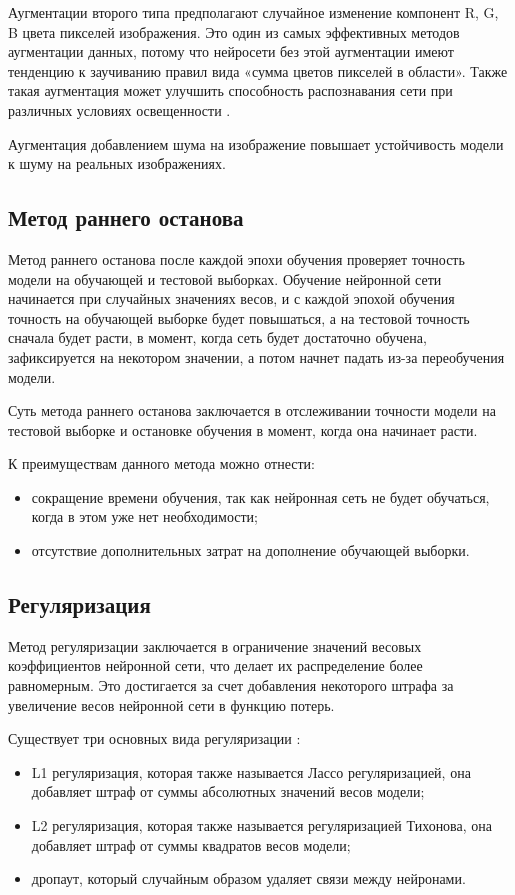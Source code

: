 Аугментации второго типа предполагают случайное изменение компонент R, G, B цвета пикселей изображения. Это один из самых эффективных методов аугментации данных, потому что нейросети без этой аугментации имеют тенденцию к заучиванию правил вида «сумма цветов пикселей в области». Также такая аугментация может улучшить способность распознавания сети при различных условиях освещенности \cite{augmentation}.

Аугментация добавлением шума на изображение повышает устойчивость модели к шуму на реальных изображениях.

\subsection{Метод раннего останова}
Метод раннего останова после каждой эпохи обучения проверяет точность модели на обучающей и тестовой выборках. Обучение нейронной сети начинается при случайных значениях весов, и с каждой эпохой обучения точность на обучающей выборке будет повышаться, а на тестовой точность сначала будет расти, в момент, когда сеть будет достаточно обучена, зафиксируется на некотором значении, а потом начнет падать из-за переобучения модели.

Суть метода раннего останова заключается в отслеживании точности модели на тестовой выборке и остановке обучения в момент, когда она начинает расти.

К преимуществам данного метода можно отнести:
\begin{itemize}
	\item сокращение времени обучения, так как нейронная сеть не будет обучаться, когда в этом уже нет необходимости;
	\item отсутствие дополнительных затрат на дополнение обучающей выборки.
\end{itemize}

\subsection{Регуляризация}
Метод регуляризации заключается в ограничение значений весовых коэффициентов нейронной сети, что делает их распределение более равномерным. Это достигается за счет добавления некоторого штрафа за увеличение весов нейронной сети в функцию потерь.

Существует три основных вида регуляризации \cite{regulisation}:
\begin{itemize}
	\item L1 регуляризация, которая также называется Лассо регуляризацией, она добавляет штраф от суммы абсолютных значений весов модели;
	\item L2 регуляризация, которая также называется регуляризацией Тихонова, она добавляет штраф от суммы квадратов весов модели;
	\item дропаут, который случайным образом удаляет связи между нейронами.
\end{itemize}

